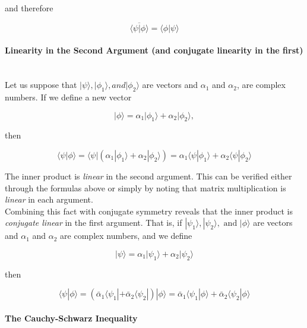 \documentclass[svgnames]{article}     %
\begin{document}
and therefore 


\[
  \overline{\langle \psi | \phi \rangle} = \langle \phi | \psi \rangle 
\] \vspace{5px}

\paragraph{Linearity in the Second Argument (and conjugate linearity in the first)} \mbox{} \\

Let us suppose that $|\psi\rangle , |\phi_1\rangle , and |\phi_2\rangle $ are vectors and $\alpha_1$ and $\alpha_2$, are complex numbers. If we define a new vector 

\[
|\phi\rangle = \alpha_1|\phi_1\rangle  + \alpha_2|\phi_2\rangle, 
\] \vspace{5px}

then 

\[
\langle \psi | \phi \rangle = \langle \psi | (\alpha_1|\phi_1\rangle + \alpha_2 |\phi_2\rangle ) = \alpha_1\langle \psi | \phi_1 \rangle + \alpha_2\langle \psi | \phi_2 \rangle 
\] \vspace{5px}


The inner product is \textit{linear} in the second argument. This can be verified either through the formulas above or simply by noting that matrix multiplication is \textit{linear} in each argument. \\

Combining this fact with conjugate symmetry reveals that the inner product is \textit{conjugate linear} in the first argument. That is, if $|\psi_1\rangle, |\psi_2\rangle, \text{ and } |\phi\rangle $ are vectors and $\alpha_1$ and $\alpha_2$ are complex numbers, and we define

\[
|\psi\rangle = \alpha_1 |\psi_1\rangle + \alpha_2 |\psi_2\rangle 
\] \vspace{5px}

then 

\[
\langle \psi | \phi \rangle  = (\bar\alpha_1 \langle \psi_1 | + \bar\alpha_2 \langle \psi_2 | )|\phi\rangle = \bar\alpha_1 \langle \psi_1 | \phi \rangle + \bar\alpha_2 \langle \psi_2 | \phi \rangle  
\] \vspace{5px}

\paragraph{The Cauchy-Schwarz Inequality} \mbox{} \\
\end{document}
